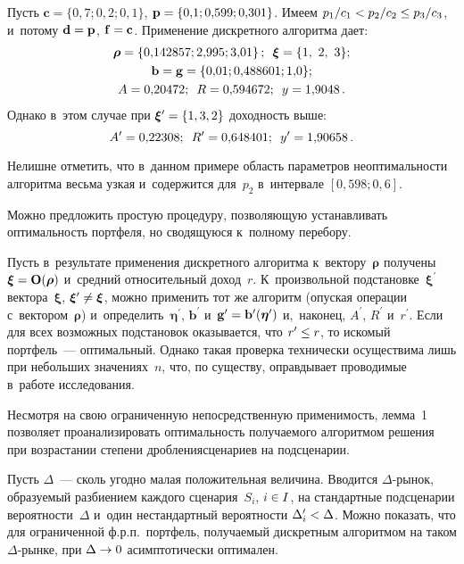 \begin{multicols}{2}
  Пусть $\mathbf{c}=\{0{,}7; 0{,}2; 0{,}1\}$, $\mathbf{p}\hm =\{0{,}1; 0{,}599; 
0{,}301\}$. Имеем $p_1\hm/c_1\hm<p_2 /c_2\hm\leq p_3/c_3$, и~потому 
$\mathbf{d}\hm=\mathbf{p}$, $\mathbf{f}\hm=\mathbf{c}$. Применение 
дискретного алгоритма дает: 
  \begin{gather*}
  \boldsymbol{\rho}=\left\{
  0{,}142857; 2{,}995; 3{,}01\right\};\enskip \boldsymbol{\xi}=\{1,\ 2,\ 3\};\\ 
  \mathbf{b} = \mathbf{g} = \{0{,}01; 0{,}488601; 1{,}0\};\\ 
  A = 0{,}20472;\enskip R = 0{,}594672;\enskip y = 1{,}9048\,. 
  \end{gather*}
    Однако в~этом случае при $\boldsymbol{\xi}^\prime \hm=\{1, 3, 2\}$ 
доходность выше: 
  $$
  A^\prime=0{,}22308;\enskip R^\prime = 0{,}648401;\enskip y^\prime = 1{,}90658\,. 
  $$
  
  Нелишне отметить, что в~данном примере область параметров 
неоптимальности алгоритма весьма узкая и~содержится для~$p_2$ в~интервале 
$[0{,}598; 0{,}6]$. 
  
  Можно предложить простую процедуру, позволяющую устанавливать 
оптимальность портфеля, но сводящуюся к~полному перебору. 
  
  Пусть в~результате применения дискретного алгоритма 
  к~вектору~$\boldsymbol{\rho}$ получены 
$\boldsymbol{\xi}\hm=\mathbf{O}(\boldsymbol{\rho})$ и~средний 
относительный доход~$r$. К~произвольной 
подстановке~$\boldsymbol{\xi}^\prime$ вектора~$\boldsymbol{\xi}$, 
$\boldsymbol{\xi}^\prime \hm \not= \boldsymbol{\xi}$, можно применить тот же 
алгоритм (опуская операции с~вектором~$\boldsymbol{\rho}$) 
и~определить~$\boldsymbol{\eta}^\prime$, $\mathbf{b}^\prime$ 
и~$\mathbf{g}^\prime\hm=\mathbf{b}^\prime(\boldsymbol{\eta}^\prime)$ 
и,~наконец, $A^\prime$, $R^\prime$ и~$r^\prime$. Если для всех возможных 
подстановок оказывается, что $r^\prime\hm\leq r$, то искомый портфель~--- 
оптимальный. 
  Однако такая проверка технически осуществима лишь при небольших 
значениях~$n$, что, по существу, оправдывает проводимые в~работе 
исследования. 
  
  Несмотря на свою ограниченную непосредст\-венную применимость, лемма~1 
позволяет про\-ана\-ли\-зи\-ро\-вать оптимальность получаемого алгорит\-мом решения 
при возрастании степени дробления\linebreak сценариев на подсценарии. 
  
  Пусть $\Delta$~--- сколь угодно малая положительная величина. Вводится 
$\Delta$-ры\-нок, образуемый разбиением каждого сценария~$S_i$, $i\hm\in I$, 
на стандартные подсценарии вероятности~$\Delta$ и~один нестандартный 
вероятности $\Delta_i^\prime\hm< \Delta$. Можно показать, что для 
ограниченной ф.р.п.\ портфель, получаемый дискретным алгоритмом на таком 
$\Delta$-рын\-ке, при $\Delta\hm\to 0$ асимптотически оптимален.
   

\end{multicols}
